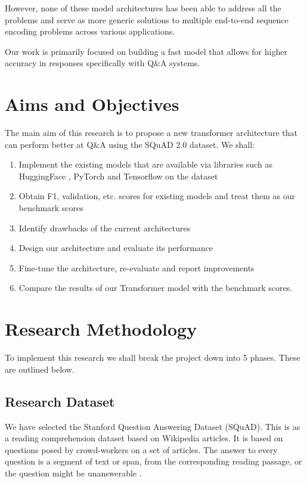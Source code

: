 \documentclass[11pt]{article}
\begin{document}
    However, none of these model architectures has been able to address all the problems and serve as more generic solutions to multiple end-to-end sequence encoding problems across various applications.

    Our work is primarily focused on building a fast model that allows for higher accuracy in responses specifically with Q\&A systems.

	\section{Aims and Objectives}\label{aims}

	The main aim of this research is to propose a new transformer architecture that can perform better at Q\&A using the SQuAD 2.0 dataset.
	We shall:
	\begin{enumerate}
		\item Implement the existing models that are available via libraries such as HuggingFace \citep{hfTransformers}, PyTorch and Tensorflow on the dataset
		\item Obtain F1, validation, etc. scores for existing models and treat them as our benchmark scores
		\item Identify drawbacks of the current architectures
		\item Design our architecture and evaluate its performance
		\item Fine-tune the architecture, re-evaluate and report improvements
		\item Compare the results of our Transformer model with the benchmark scores.
	\end{enumerate}

	\section{Research Methodology}\label{researchMeth}

	To implement this research we shall break the project down into 5 phases. These are outlined below.
	\subsection{Research Dataset}\label{datas}

	We have selected the Stanford Question Answering Dataset (SQuAD). This is as a reading comprehension dataset based on Wikipedia articles. It is based on questions posed by crowd-workers on a set of articles. The answer to every question is a segment of text or span, from the corresponding reading passage, or the question might be unanswerable \citep{dataset}.
\end{document}
